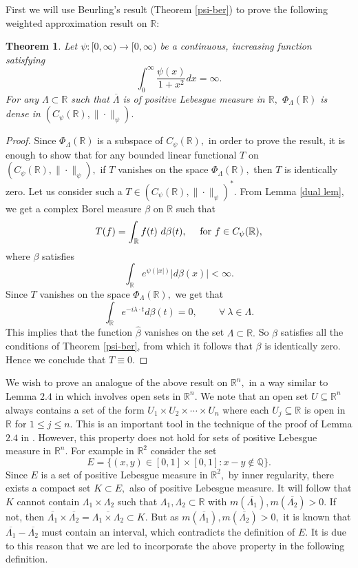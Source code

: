 \documentclass [11pt]{amsart}
\newtheorem{Thm}{Theorem}[section]
\newcommand{\R}{\mathbb R}
\newcommand{\txt} {\textmd}
\newcommand{\be} {\begin{equation}}
\newcommand{\ee} {\end{equation}}
\numberwithin{equation}{section}
\begin{document}
First we will use Beurling's result (Theorem \ref{psi-ber}) to prove the following weighted approximation result on $\R:$ 
\begin{Thm}\label{density}
Let $\psi:[0,\infty) \rightarrow [0,\infty)$ be a continuous, increasing function satisfying 
\be \label{intinf} \int_0^{\infty}\dfrac{\psi(x)}{1+x^2}dx=\infty. \ee
For any $\Lambda \subset \R$ such that $\overline{\Lambda}$ is of positive Lebesgue measure in $\R,$ $\Phi_{\Lambda}(\R)$ is dense in $(C_{\psi}(\R),\|\cdot \|_{\psi}).$
\end{Thm}
\begin{proof}
Since $\Phi_{\Lambda}(\R)$ is a subspace of $C_{\psi}(\R),$ in order to prove the result, it is enough to show that for any bounded linear functional $T$ on $(C_{\psi}(\R),\|\cdot \|_{\psi}),$ if $T$ vanishes on the space $\Phi_{\Lambda}(\R),$ then $T$ is identically zero. Let us consider such a $T \in (C_{\psi}(\R),\|\cdot \|_{\psi})^*.$ From Lemma \ref{dual lem}, we get a complex  Borel measure $\beta$ on $\R$ such that
$$T(f)=\int_\R f(t) ~ d\beta(t), \quad \txt{ for } f \in C_{\psi}(\R),$$
where $\beta$ satisfies $$\int_{ \R}e^{\psi(|x|)}|d\beta(x)|<\infty.$$
Since $T$ vanishes on the space $\Phi_{\Lambda}(\R),$ we get that  
$$ \int_\R e^{-i\lambda\cdot t}d\beta(t)=0, \quad \quad ~\forall ~ \lambda \in \Lambda.$$
This implies that the function $\hat{\beta}$ vanishes on the set $\Lambda \subset \R.$ So $\beta$ satisfies all the conditions of Theorem \ref{psi-ber}, from which it follows that $\beta$ is identically zero. Hence we conclude that $ T \equiv 0.$
\end{proof}

We wish to prove an analogue of the above result on $\R^n,$ in a way similar to Lemma $2.4$ in \cite{BRS} which involves open sets in $\R^n.$ We note that an open set $U\subseteq \R^n$ always contains a set of the form $U_1\times U_2 \times \cdots \times U_n$ where each $U_j \subseteq \R$ is open in $\R$ for $1\leq j \leq n.$ This is an important tool in the technique of the proof of Lemma $2.4$ in \cite{BRS}. However, this property does not hold for sets of positive Lebesgue measure in $\R^n$. For example in $\mathbb{R}^2$ consider the set 
$$E=\lbrace (x,y)\in [0,1]\times [0,1] : x-y \notin \mathbb{Q} \rbrace .$$ Since $E$ is a set of positive Lebesgue measure in $\R^2,$ by inner regularity, there exists a compact set $K\subset E,$ also of positive Lebesgue measure. 
It will follow that $K$ cannot contain $\Lambda_1 \times \Lambda_2$ such that $\Lambda_1, \Lambda_2 \subset \mathbb{R}$ with $m(\overline{\Lambda_1}), m(\overline{\Lambda_2})>0.$ If not, then $\overline{\Lambda_1} \times \overline{\Lambda_2} =\overline{\Lambda_1 \times \Lambda_2} \subset K.$ But as $m(\overline{\Lambda_1}), m(\overline{\Lambda_2})>0,$ it is known that $\overline{\Lambda_1} - \overline{\Lambda_2}$ must contain an interval, which contradicts the definition of $E$. It is due to this reason that we are led to incorporate the above property in the following definition.
\end{document}
